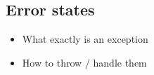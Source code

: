 \subsection{Error states}

\begin{itemize}
    \item What exactly is an exception
    \item How to throw / handle them
\end{itemize}
